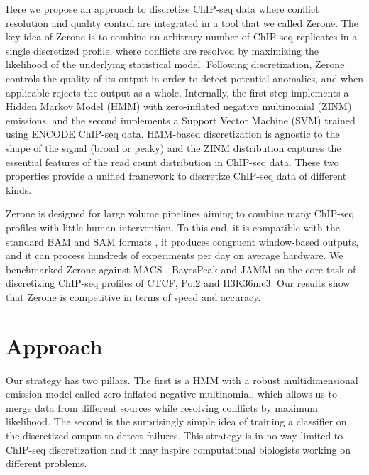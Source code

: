 \documentclass{bioinfo}
\begin{document}
Here we propose an approach to discretize ChIP-seq data where conflict
resolution and quality control are integrated in a tool that we called
Zerone. The key idea of Zerone is to combine an arbitrary number of
ChIP-seq replicates in a single discretized profile, where conflicts are
resolved by maximizing the likelihood of the underlying statistical model.
Following discretization, Zerone controls the quality of its output in
order to detect potential anomalies, and when applicable rejects the
output as a whole. Internally, the first step implements a Hidden Markov
Model (HMM) with zero-inflated negative multinomial (ZINM) emissions, and
the second implements a Support Vector Machine (SVM) trained using ENCODE
ChIP-seq data. HMM-based discretization is agnostic to the shape of the
signal (broad or peaky) and the ZINM distribution captures the essential
features of the read count distribution in ChIP-seq data. These two
properties provide a unified framework to discretize ChIP-seq data of
different kinds.

Zerone is designed for large volume pipelines aiming to combine many
ChIP-seq profiles with little human intervention. To this end, it is
compatible with the standard BAM and SAM formats \citep{pmid19505943},
it produces congruent window-based outputs, and it can process hundreds
of experiments per day on average hardware. We benchmarked Zerone against
MACS \citep{pmid}, BayesPeak \citep{pmid} and JAMM \citep{pmid} on the core
task of discretizing ChIP-seq profiles of CTCF, Pol2 and H3K36me3. Our
results show that Zerone is competitive in terms of speed and accuracy.

\section{Approach}
Our strategy has two pillars. The first is a HMM with a robust multidimensional
emission model called zero-inflated negative multinomial, which allows us to
merge data from different sources while resolving conflicts by maximum
likelihood. The second is the surprisingly simple idea of training a classifier
on the discretized output to detect failures. This strategy is in no way limited
to ChIP-seq discretization and it may inspire computational biologists working
on different problems.
\end{document}
